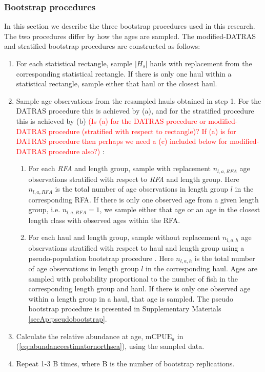 \documentclass[a4paper 12pt]{article}
\numberwithin{equation}{section}
\newcommand{\ed}[1]{\textcolor{red}{#1}}
\begin{document}
\subsubsection{Bootstrap procedures}
\label{sec:datrasstratifiedbootstrap}
In this section we describe the three bootstrap procedures used in this research. The two procedures differ by how the ages are sampled. The modified-DATRAS and stratified bootstrap procedures are constructed as follows:
\begin{enumerate}
\item For each statistical rectangle, sample $|H_s|$ hauls with replacement from the corresponding statistical rectangle. If there is only one haul within a statistical rectangle, sample either that haul or the closest haul.
\item Sample age observations from the resampled hauls obtained in step 1. For the DATRAS procedure this is achieved by (a), and for the stratified procedure this is achieved by (b) \ed{(Is (a) for the DATRAS procedure or modified-DATRAS procedure (stratified with respect to rectangle)? If (a) is for DATRAS procedure then perhaps we need a (c) included below for modified-DATRAS procedure also?)} :
\begin{enumerate}
\item For each \textit{RFA} and length group, sample with replacement $n_{l,a,RFA}$ age observations stratified with respect to \textit{RFA} and length group. Here $n_{l,a,RFA}$ is the total number of age observations in length group $l$ in the corresponding RFA. If there is only one observed age from a given length group, i.e. $n_{l,a,RFA} = 1$, we sample either that age or an age in the closest length class with observed ages within the RFA.
\item For each haul and length group, sample without replacement  $n_{l,a,h}$ age observations stratified with respect to haul and length group using a pseudo-population bootstrap procedure \citep{mashreghi2016survey}. Here $n_{l,a,h}$ is the total number of age observations in length group $l$ in the corresponding haul. Ages are sampled with probability  proportional to the number of fish in the corresponding length group and haul. If there is only one observed age within a length group in a haul, that age is sampled. The pseudo bootstrap procedure is presented in Supplementary Materials \ref{secAp:pseudobootstrap}. 

\end{enumerate}
\item Calculate the relative abundance at age, $\text{mCPUE}_a$ in (\ref{eq:abundanceestimatornorthsea}), using the sampled data.
\item Repeat 1-3 B times, where B is the number of bootstrap replications.
\end{enumerate}
\end{document}

